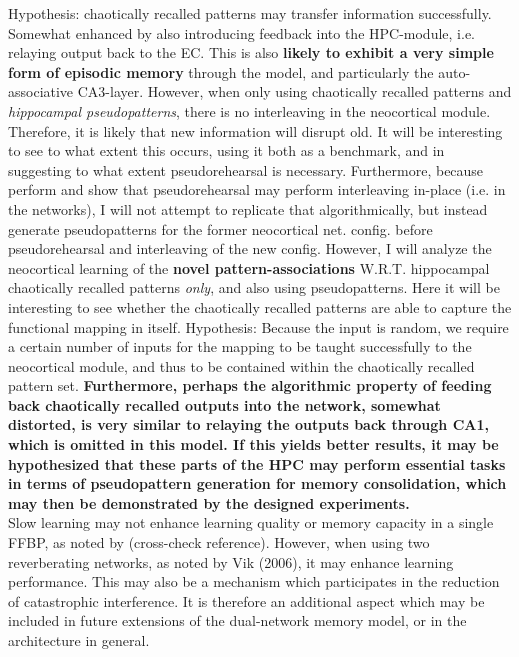 Hypothesis: chaotically recalled patterns may transfer information successfully. Somewhat enhanced by also introducing feedback into the HPC-module, i.e. relaying output back to the EC. This is also \textbf{likely to exhibit a very simple form of episodic memory} through the model, and particularly the auto-associative CA3-layer. However, when only using chaotically recalled patterns and \textit{hippocampal pseudopatterns}, there is no interleaving in the neocortical module. Therefore, it is likely that new information will disrupt old. It will be interesting to see to what extent this occurs, using it both as a benchmark, and in suggesting to what extent pseudorehearsal is necessary. Furthermore, because \cite{Ans1997} perform and show that pseudorehearsal may perform interleaving in-place (i.e. in the networks), I will not attempt to replicate that algorithmically, but instead generate pseudopatterns for the former neocortical net. config. before pseudorehearsal and interleaving of the new config. However, I will analyze the neocortical learning of the \textbf{novel pattern-associations} W.R.T. hippocampal chaotically recalled patterns \textit{only}, and also using pseudopatterns. Here it will be interesting to see whether the chaotically recalled patterns are able to capture the functional mapping in itself. Hypothesis: Because the input is random, we require a certain number of inputs for the mapping to be taught successfully to the neocortical module, and thus to be contained within the chaotically recalled pattern set. \textbf{Furthermore, perhaps the algorithmic property of feeding back chaotically recalled outputs into the network, somewhat distorted, is very similar to relaying the outputs back through CA1, which is omitted in this model. If this yields better results, it may be hypothesized that these parts of the HPC may perform essential tasks in terms of pseudopattern generation for memory consolidation, which may then be demonstrated by the designed experiments.}
\\

Slow learning may not enhance learning quality or memory capacity in a single FFBP, as noted by \cite{Ans1997} (cross-check reference). However, when using two reverberating networks, as noted by Vik (2006), it may enhance learning performance. This may also be a mechanism which participates in the reduction of catastrophic interference. It is therefore an additional aspect which may be included in future extensions of the dual-network memory model, or in the architecture in general.

